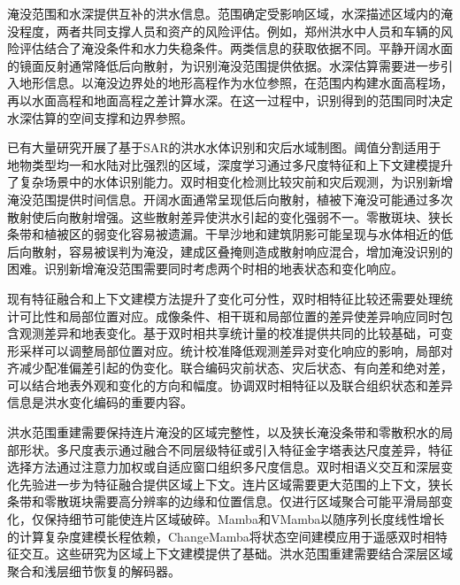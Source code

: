 \documentclass[authoryear,preprint,12pt]{elsarticle}
\begin{document}
淹没范围和水深提供互补的洪水信息。范围确定受影响区域，水深描述区域内的淹没程度，两者共同支撑人员和资产的风险评估。例如，郑州洪水中人员和车辆的风险评估结合了淹没条件和水力失稳条件\citep{dong2022urbanrisk}。两类信息的获取依据不同。平静开阔水面的镜面反射通常降低后向散射，为识别淹没范围提供依据\citep{amitrano2024sarFloodReview}。水深估算需要进一步引入地形信息。以淹没边界处的地形高程作为水位参照，在范围内构建水面高程场，再以水面高程和地面高程之差计算水深\citep{cian2018flood}。在这一过程中，识别得到的范围同时决定水深估算的空间支撑和边界参照。

已有大量研究开展了基于SAR的洪水水体识别和灾后水域制图\citep{jiang2021rapid,lee2026smagnet}。阈值分割适用于地物类型均一和水陆对比强烈的区域，深度学习通过多尺度特征和上下文建模提升了复杂场景中的水体识别能力\citep{du2026high}。双时相变化检测比较灾前和灾后观测，为识别新增淹没范围提供时间信息\citep{giustarini2013urbanFloodCd}。开阔水面通常呈现低后向散射，植被下淹没可能通过多次散射使后向散射增强\citep{tsyganskaya2018vegetation}。这些散射差异使洪水引起的变化强弱不一\citep{amitrano2024sarFloodReview}。零散斑块、狭长条带和植被区的弱变化容易被遗漏。干旱沙地和建筑阴影可能呈现与水体相近的低后向散射，容易被误判为淹没，建成区叠掩则造成散射响应混合，增加淹没识别的困难\citep{garg2024aridFlood,yu2024urbanFloodThreshold}。识别新增淹没范围需要同时考虑两个时相的地表状态和变化响应。

现有特征融合和上下文建模方法提升了变化可分性\citep{saleh2024dam,du2026high}，双时相特征比较还需要处理统计可比性和局部位置对应。成像条件、相干斑和局部位置的差异使差异响应同时包含观测差异和地表变化。基于双时相共享统计量的校准提供共同的比较基础，可变形采样\citep{zhu2021deformable}可以调整局部位置对应。统计校准降低观测差异对变化响应的影响，局部对齐减少配准偏差引起的伪变化。联合编码灾前状态、灾后状态、有向差和绝对差，可以结合地表外观和变化的方向和幅度。协调双时相特征以及联合组织状态和差异信息是洪水变化编码的重要内容。

洪水范围重建需要保持连片淹没的区域完整性，以及狭长淹没条带和零散积水的局部形状。多尺度表示通过融合不同层级特征或引入特征金字塔表达尺度差异\citep{wu2022msdeeplab,zhao2023siamdwenet,tahermanesh2025siscnet}，特征选择方法通过注意力加权或自适应窗口组织多尺度信息\citep{yadav2022attentive,zhu2025globalfloodsar}。双时相语义交互和深层变化先验进一步为特征融合提供区域上下文\citep{chen2021remote,han2023change}。连片区域需要更大范围的上下文，狭长条带和零散斑块需要高分辨率的边缘和位置信息。仅进行区域聚合可能平滑局部变化，仅保持细节可能使连片区域破碎。Mamba和VMamba以随序列长度线性增长的计算复杂度建模长程依赖\citep{gu2023mamba,liu2024vmamba}，ChangeMamba将状态空间建模应用于遥感双时相特征交互\citep{chen2024changemamba}。这些研究为区域上下文建模提供了基础。洪水范围重建需要结合深层区域聚合和浅层细节恢复的解码器。
\end{document}
